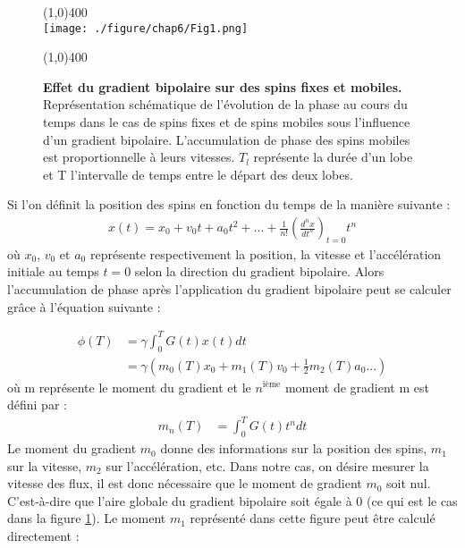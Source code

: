 \begin{figure}[H]
\centering
\line(1,0){400} \\
\texttt{[image: ./figure/chap6/Fig1.png]}
\caption[Effet du gradient bipolaire sur des spins fixes et mobiles.]{\label{fig:PhaseSpins} \textbf{Effet du gradient bipolaire sur des spins fixes et mobiles.} Représentation schématique de l'évolution de la phase au cours du temps dans le cas de spins fixes et de spins mobiles sous l'influence d'un gradient bipolaire. L'accumulation de phase des spins mobiles est proportionnelle à leurs vitesses. $T_l$ représente la durée d'un lobe et T l'intervalle de temps entre le départ des deux lobes. }
\line(1,0){400} \\ 
\end{figure}
Si l'on définit la position des spins en fonction du temps de la manière suivante :
\begin{align}
x(t)=x_0 + v_0 t +a_0 t^2 + ... + \frac{1}{n!} \left(\frac{d^n x}{dt^n}\right)_{t=0} t^n
\end{align}
où $x_0$, $v_0$ et $a_0$ représente respectivement la position, la vitesse et l'accélération initiale au temps $t=0$ selon la direction du gradient bipolaire. Alors l'accumulation de phase après l'application du gradient bipolaire peut se calculer grâce à l'équation suivante :

\begin{align}
\phi (T) &= \gamma \int_0^T G(t) x(t) dt \\
			 &= \gamma (m_0(T) x_0 + m_1(T) v_0 + \frac{1}{2} m_2(T) a_0 ...)
\end{align}
où m représente le moment du gradient et le $n^{\text{ième}}$ moment de gradient m est défini par :
\begin{align}
m_n (T) &= \int_0^T G(t) t^n dt			
\end{align}
Le moment du gradient $m_0$ donne des informations sur la position des spins, $m_1$ sur la vitesse, $m_2$ sur l'accélération, etc.
Dans notre cas, on désire mesurer la vitesse des flux, il est donc nécessaire que le moment de gradient $m_0$ soit nul. C'est-à-dire que l'aire globale du gradient bipolaire soit égale à 0 (ce qui est le cas dans la figure \ref{fig:PhaseSpins}). Le moment $m_1$ représenté dans cette figure peut être calculé directement :
	
